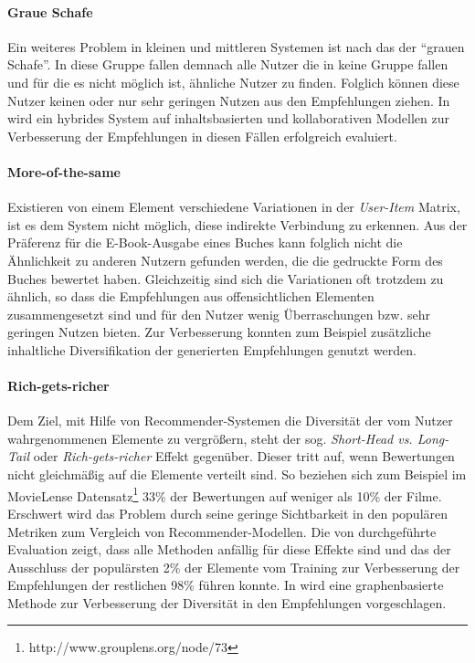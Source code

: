 \paragraph{Graue Schafe} Ein weiteres Problem in kleinen und mittleren Systemen ist nach \citep{claypool99} das der ``grauen Schafe''. In diese Gruppe fallen demnach alle Nutzer die in keine Gruppe fallen und für die es nicht möglich ist, ähnliche Nutzer zu finden. Folglich können diese Nutzer keinen oder nur sehr geringen Nutzen aus den Empfehlungen ziehen. In \citep{claypool99} wird ein hybrides System auf inhaltsbasierten und kollaborativen Modellen zur Verbesserung der Empfehlungen in diesen Fällen erfolgreich evaluiert. \citep{Burke:2002:HRS:586321.586352}

\paragraph{More-of-the-same} Existieren von einem Element verschiedene Variationen in der \textit{User-Item} Matrix, ist es dem System nicht möglich, diese indirekte Verbindung zu erkennen. Aus der Präferenz für die E-Book-Ausgabe eines Buches kann folglich nicht die Ähnlichkeit zu anderen Nutzern gefunden werden, die die gedruckte Form des Buches bewertet haben. Gleichzeitig sind sich die Variationen oft trotzdem zu ähnlich, so dass die Empfehlungen aus offensichtlichen Elementen zusammengesetzt sind und für den Nutzer wenig Überraschungen bzw. sehr geringen Nutzen bieten. Zur Verbesserung konnten zum Beispiel zusätzliche inhaltliche Diversifikation der generierten Empfehlungen genutzt werden. \citep[Kap. 3]{rs}

\paragraph{Rich-gets-richer}\label{sec:richgetsricher} Dem Ziel, mit Hilfe von Recommender-Systemen die Diversität der vom Nutzer wahrgenommenen Elemente zu vergrößern, steht der sog. \textit{Short-Head vs. Long-Tail} oder \textit{Rich-gets-richer} Effekt gegenüber. Dieser tritt auf, wenn Bewertungen nicht gleichmäßig auf die Elemente verteilt sind. So beziehen sich zum Beispiel im MovieLense Datensatz\footnote{http://www.grouplens.org/node/73} 33\% der Bewertungen auf weniger als 10\% der Filme. Erschwert wird das Problem durch seine geringe Sichtbarkeit in den populären Metriken zum Vergleich von Recommender-Modellen. Die von \citep{Cremonesi:2010:PRA:1864708.1864721} durchgeführte Evaluation zeigt, dass alle Methoden anfällig für diese Effekte sind und das der Ausschluss der populärsten 2\% der Elemente vom Training zur Verbesserung der Empfehlungen der restlichen 98\% führen konnte. In \citep{Yin:2012:CLT:2311906.2311916} wird eine graphenbasierte Methode zur Verbesserung der Diversität in den Empfehlungen vorgeschlagen.

